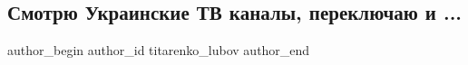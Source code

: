  
 
 
 
 
 
\subsection{Смотрю Украинские ТВ каналы, переключаю и ...}
\label{sec:03_12_2021.fb.titarenko_lubov.1.ukrtv}
 
\ifcmt
 author_begin
   author_id titarenko_lubov
 author_end
\fi


